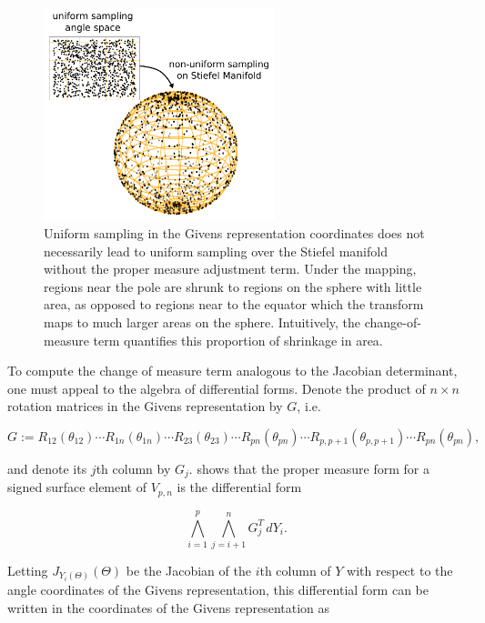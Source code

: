 \documentclass[ba]{imsart}
\numberwithin{equation}{section}
\theoremstyle{plain}
\begin{document}
\begin{figure}[h]
\centering
\vspace{.1in}
\includegraphics[width=0.6\textwidth]{figures/AreaForm_atz.pdf}
\vspace{.05in}
\caption{Uniform sampling in the Givens representation coordinates does not necessarily lead to uniform sampling over the Stiefel manifold without the proper measure adjustment term. Under the mapping, regions near the pole are shrunk to regions on the sphere with little area, as opposed to regions near to the equator which the transform maps to much larger areas on the sphere. Intuitively, the change-of-measure term quantifies this proportion of shrinkage in area.}
\label{fig:AreaForm}
\end{figure}


\noindent To compute the change of measure term analogous to the Jacobian determinant, one must appeal to the algebra of differential forms. Denote the product of $n \times n$ rotation matrices in the Givens representation by $G$, i.e. 


\begin{equation}
G := R_{12}(\theta_{12}) \cdots R_{1n}(\theta_{1n})  \cdots R_{23}(\theta_{23}) \cdots R_{pn}(\theta_{pn}) \cdots R_{p,p+1}(\theta_{p,p+1}) \cdots R_{pn}(\theta_{pn}),
\end{equation}

\noindent and denote its $j$th column by $G_j$. \cite{muirhead2009aspects} shows that the proper measure form for a signed surface element of $V_{p,n}$ is the differential form

\begin{equation}
\label{eq:WedgeForm}
\bigwedge_{i=1}^p \bigwedge_{j=i+1}^n G_j^T\, dY_i.
\end{equation}

\noindent Letting $J_{Y_i(\Theta)}(\Theta)$ be the Jacobian of the $i$th column of $Y$ with respect to the angle coordinates of the Givens representation, this differential form can be written in the coordinates of the Givens representation as
\end{document}
